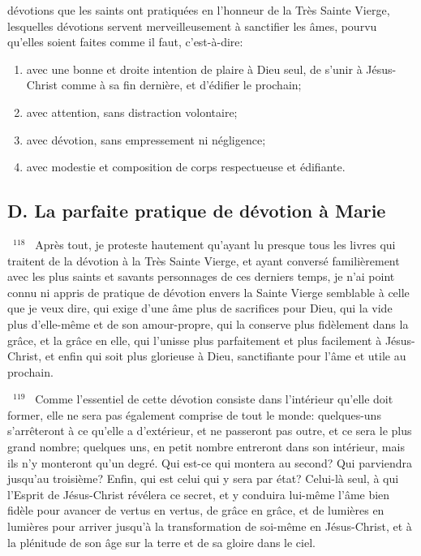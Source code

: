 \documentclass[paper=a5,pagesize=pdftex,fontsize=15pt,headinclude=on,twoside=off]{scrbook}
\newcommand{\negphantom}[1]{\settowidth{\dimen0}{#1}\hspace*{-\dimen0}}
\newcommand{\versenb}[1]{\par \vspace{10pt}~\negphantom{~${}^{#1}$~}${}^{#1}$~}
\begin{document}
dévotions que les saints ont pratiquées en l'honneur de la Très Sainte Vierge, lesquelles dévotions servent
merveilleusement à sanctifier les âmes, pourvu qu'elles soient faites comme il faut, c'est-à-dire:
\begin{enumerate}[label=\arabic*°]
  \item avec une bonne et droite intention de plaire à Dieu seul, de s'unir à Jésus-Christ comme à sa fin dernière, et d'édifier le prochain;
  \item avec attention, sans distraction volontaire;
  \item avec dévotion, sans empressement ni négligence;
  \item avec modestie et composition de corps respectueuse et édifiante.
\end{enumerate}

\subsection{D. La parfaite pratique de dévotion à Marie}
\versenb{118} Après tout, je proteste hautement qu'ayant lu presque tous les livres qui traitent de la dévotion à la Très
Sainte Vierge, et ayant conversé familièrement avec les plus saints et savants personnages de ces derniers
temps, je n'ai point connu ni appris de pratique de dévotion envers la Sainte Vierge semblable à celle que je veux
dire, qui exige d'une âme plus de sacrifices pour Dieu, qui la vide plus d'elle-même et de son amour-propre, qui la
conserve plus fidèlement dans la grâce, et la grâce en elle, qui l'unisse plus parfaitement et plus facilement à
Jésus-Christ, et enfin qui soit plus glorieuse à Dieu, sanctifiante pour l'âme et utile au prochain.
\versenb{119} Comme l'essentiel de cette dévotion consiste dans l'intérieur qu'elle doit former, elle ne sera pas également
comprise de tout le monde: quelques-uns s'arrêteront à ce qu'elle a d'extérieur, et ne passeront pas outre, et ce
sera le plus grand nombre; quelques uns, en petit nombre entreront dans son intérieur, mais ils n'y monteront
qu'un degré. Qui est-ce qui montera au second? Qui parviendra jusqu'au troisième? Enfin, qui est celui qui y sera
par état? Celui-là seul, à qui l'Esprit de Jésus-Christ révélera ce secret, et y conduira lui-même l'âme bien fidèle
pour avancer de vertus en vertus, de grâce en grâce, et de lumières en lumières pour arriver jusqu'à la
transformation de soi-même en Jésus-Christ, et à la plénitude de son âge sur la terre et de sa gloire dans le ciel.
\end{document}
